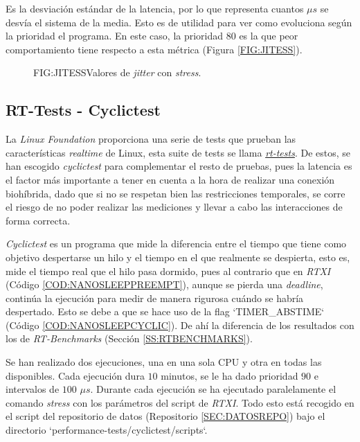 Es la desviación estándar de la latencia, por lo que representa cuantos $\mu s$ se desvía el sistema de la media. Esto es de utilidad para ver como evoluciona según la prioridad el programa. En este caso, la prioridad $80$ es la que peor comportamiento tiene respecto a esta métrica (Figura \ref{FIG:JITESS}).

\begin{figure}[Jitter con estrés]{FIG:JITESS}{Valores de \textit{jitter} con \textit{stress}.}
\end{figure}




\subsection{RT-Tests - Cyclictest\label{SS:CYCLICTEST}}

La \textit{Linux Foundation} proporciona una serie de tests que prueban las características \textit{realtime} de Linux, esta suite de tests se llama \href{https://git.kernel.org/pub/scm/utils/rt-tests/rt-tests.git}{\textit{rt-tests}}.
De estos, se han escogido \textit{cyclictest} para complementar el resto de pruebas, pues la latencia es el factor más importante a tener en cuenta a la hora de realizar una conexión biohíbrida, dado que si no se respetan bien las restricciones temporales, se corre el riesgo de no poder realizar las mediciones y llevar a cabo las interacciones de forma correcta.

\textit{Cyclictest} es un programa que mide la diferencia entre el tiempo que tiene como objetivo despertarse un hilo y el tiempo en el que realmente se despierta, esto es, mide el tiempo real que el hilo pasa dormido, pues al contrario que en \textit{RTXI} (Código \ref{COD:NANOSLEEPPREEMPT}), aunque se pierda una \textit{deadline}, continúa la ejecución para medir de manera rigurosa cuándo se habría despertado. Esto se debe a que se hace uso de la flag `TIMER\_ABSTIME` (Código \ref{COD:NANOSLEEPCYCLIC}). De ahí la diferencia de los resultados con los de \textit{RT-Benchmarks} (Sección \ref{SS:RTBENCHMARKS}).

Se han realizado dos ejecuciones, una en una sola CPU y otra en todas las disponibles. Cada ejecución dura $10$ minutos, se le ha dado prioridad $90$ e intervalos de $100$ $\mu s$. Durante cada ejecución se ha ejecutado paralelamente el comando \textit{stress} con los parámetros del script de \textit{RTXI}. Todo esto está recogido en el script del repositorio de datos (Repositorio \ref{SEC:DATOSREPO}) bajo el directorio `performance-tests/cyclictest/scripts`.


